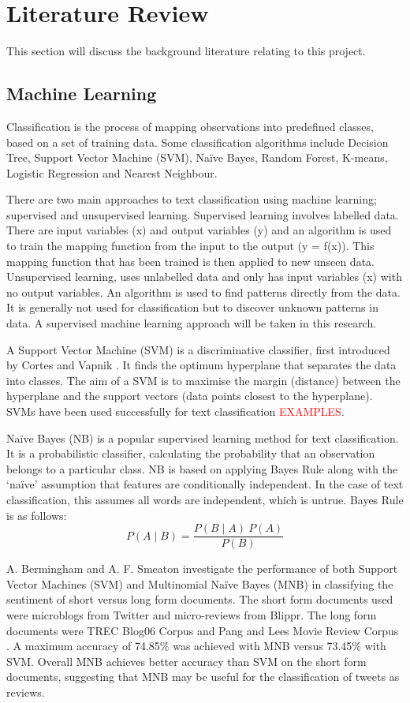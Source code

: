 \chapter{Literature Review}
This section will discuss the background literature relating to this project.

\section{Machine Learning}
Classification is the process of mapping observations into predefined classes, based on a set of training data. Some classification algorithms include Decision Tree, Support Vector Machine (SVM), Naïve Bayes, Random Forest, K-means, Logistic Regression and Nearest Neighbour.

There are two main approaches to text classification using machine learning; supervised and unsupervised learning. Supervised learning involves labelled data. There are input variables (x) and output variables (y) and an algorithm is used to train the mapping function from the input to the output (y = f(x)). This mapping function that has been trained is then applied to new unseen data. Unsupervised learning, uses unlabelled data and only has input variables (x) with no output variables. An algorithm is used to find patterns directly from the data. It is generally not used for classification but to discover unknown patterns in data. A supervised machine learning approach will be taken in this research.

A Support Vector Machine (SVM) is a discriminative classifier, first introduced by Cortes and Vapnik \cite{Vapnik1995,Vapnik21995}. It finds the optimum hyperplane that separates the data into classes. The aim of a SVM is to maximise the margin (distance) between the hyperplane and the support vectors (data points closest to the hyperplane). SVMs have been used successfully for text classification \textcolor{red}{EXAMPLES}.

Naïve Bayes (NB) is a popular supervised learning method for text classification. It is a probabilistic classifier, calculating the probability that an observation belongs to a particular class. NB is based on applying Bayes Rule along with the ‘naïve’ assumption that features are conditionally independent. In the case of text classification, this assumes all words are independent, which is untrue. Bayes Rule is as follows:  \[P(A\mid B)=\frac{P(B\mid A)\:P(A)}{P(B)}\] 

A. Bermingham and A. F. Smeaton \cite{Berm2010} investigate the performance of both Support Vector Machines (SVM) and Multinomial Naïve Bayes (MNB) in classifying the sentiment of short versus long form documents. The short form documents used were microblogs from Twitter and micro-reviews from Blippr. The long form documents were TREC Blog06 Corpus and Pang and Lees Movie Review Corpus \cite{panglee2004}. A maximum accuracy of 74.85\% was achieved with MNB versus 73.45\% with SVM. Overall MNB achieves better accuracy than SVM on the short form documents, suggesting that MNB may be useful for the classification of tweets as reviews.

